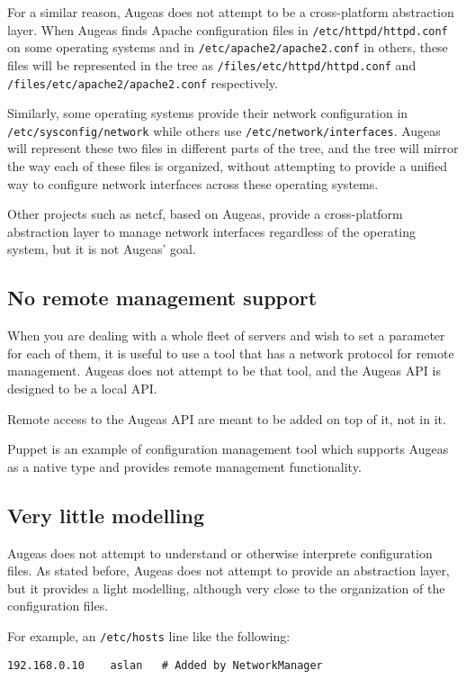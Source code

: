 For a similar reason, Augeas does not attempt to be a cross-platform abstraction layer. When Augeas finds Apache configuration files in \verb!/etc/httpd/httpd.conf! on some operating systems and in \verb!/etc/apache2/apache2.conf! in others, these files will be represented in the tree as \verb!/files/etc/httpd/httpd.conf! and \verb!/files/etc/apache2/apache2.conf! respectively.

Similarly, some operating systems provide their network configuration in \verb!/etc/sysconfig/network! while others use \verb!/etc/network/interfaces!. Augeas will represent these two files in different parts of the tree, and the tree will mirror the way each of these files is organized, without attempting to provide a unified way to configure network interfaces across these operating systems.

Other projects such as netcf, based on Augeas, provide a cross-platform abstraction layer to manage network interfaces regardless of the operating system, but it is not Augeas' goal.

\subsection{No remote management support}

When you are dealing with a whole fleet of servers and wish to set a parameter for each of them, it is useful to use a tool that has a network protocol for remote management. Augeas does not attempt to be that tool, and the Augeas API is designed to be a local API.

Remote access to the Augeas API are meant to be added on top of it, not in it.

Puppet is an example of configuration management tool which supports Augeas as a native type and provides remote management functionality.

\subsection{Very little modelling}

Augeas does not attempt to understand or otherwise interprete configuration files. As stated before, Augeas does not attempt to provide an abstraction layer, but it provides a light modelling, although very close to the organization of the configuration files.

For example, an \verb!/etc/hosts! line like the following:

\begin{verbatim}
192.168.0.10    aslan   # Added by NetworkManager
\end{verbatim}

